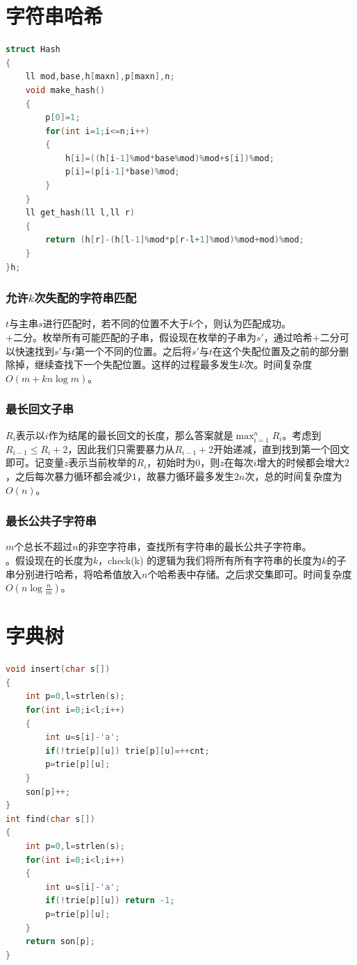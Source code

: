 \documentclass[a4paper]{book}
\begin{document}
\fi
\section{字符串哈希}
\begin{lstlisting}[language=c++]
struct Hash
{
    ll mod,base,h[maxn],p[maxn],n;
    void make_hash()
    {
        p[0]=1;
        for(int i=1;i<=n;i++)
        {
            h[i]=((h[i-1]%mod*base%mod)%mod+s[i])%mod;
            p[i]=(p[i-1]*base)%mod;
        }
    }
    ll get_hash(ll l,ll r)
    {
        return (h[r]-(h[l-1]%mod*p[r-l+1]%mod)%mod+mod)%mod;
    }
}h;
\end{lstlisting}
\subsubsection{允许$k$次失配的字符串匹配}
$t$与主串$s$进行匹配时，若不同的位置不大于$k$个，则认为匹配成功。\\
$+$二分。枚举所有可能匹配的子串，假设现在枚举的子串为$s'$，通过哈希$+$二分可以快速找到$s'$与$t$第一个不同的位置。之后将$s'$与$t$在这个失配位置及之前的部分删除掉，继续查找下一个失配位置。这样的过程最多发生$k$次。时间复杂度$O(m+kn\log m)$。\\
\subsubsection{最长回文子串}
$R_i$表示以$i$作为结尾的最长回文的长度，那么答案就是$\max_{i=1}^{n}R_i$。考虑到$R_{i-1}\leq R_i+2$，因此我们只需要暴力从$R_{i-1}+2$开始递减，直到找到第一个回文即可。记变量$z$表示当前枚举的$R_i$，初始时为$0$，则$z$在每次$i$增大的时候都会增大$2$，之后每次暴力循环都会减少$1$，故暴力循环最多发生$2n$次，总的时间复杂度为$O(n)$。\\
\subsubsection{最长公共子字符串}
$m$个总长不超过$n$的非空字符串，查找所有字符串的最长公共子字符串。\\
。假设现在的长度为$k$，check(k) 的逻辑为我们将所有所有字符串的长度为$k$的子串分别进行哈希，将哈希值放入$n$个哈希表中存储。之后求交集即可。时间复杂度$O(n\log\frac{n}{m})$。
\section{字典树}
\begin{lstlisting}[language=c++]
void insert(char s[])
{
    int p=0,l=strlen(s);
    for(int i=0;i<l;i++)
    {
        int u=s[i]-'a';
        if(!trie[p][u]) trie[p][u]=++cnt;
        p=trie[p][u];		
    }
    son[p]++;
}
int find(char s[])
{
    int p=0,l=strlen(s);
    for(int i=0;i<l;i++)
    {
        int u=s[i]-'a';
        if(!trie[p][u]) return -1;
        p=trie[p][u];
    }
    return son[p];
}
\end{lstlisting}
\end{document}
